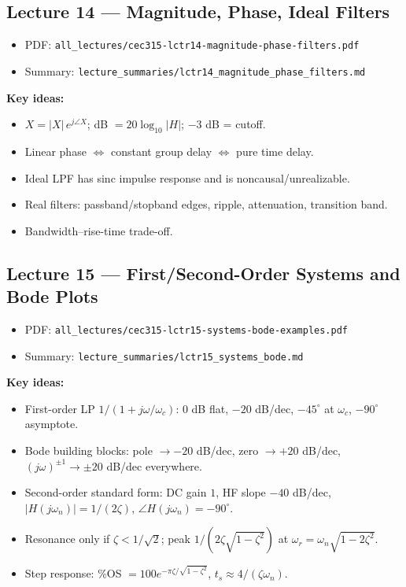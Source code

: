 \documentclass[11pt]{article}
\begin{document}
\subsection{Lecture 14 --- Magnitude, Phase, Ideal Filters}
\begin{itemize}[leftmargin=*]
  \item PDF: \texttt{all\_lectures/cec315-lctr14-magnitude-phase-filters.pdf}
  \item Summary: \texttt{lecture\_summaries/lctr14\_magnitude\_phase\_filters.md}
\end{itemize}
\textbf{Key ideas:}
\begin{itemize}[leftmargin=*]
  \item $X = |X|\, e^{j\angle X}$; dB $=20\log_{10}|H|$; $-3$ dB = cutoff.
  \item Linear phase $\Leftrightarrow$ constant group delay $\Leftrightarrow$ pure time delay.
  \item Ideal LPF has sinc impulse response and is noncausal/unrealizable.
  \item Real filters: passband/stopband edges, ripple, attenuation, transition band.
  \item Bandwidth--rise-time trade-off.
\end{itemize}

\subsection{Lecture 15 --- First/Second-Order Systems and Bode Plots}
\begin{itemize}[leftmargin=*]
  \item PDF: \texttt{all\_lectures/cec315-lctr15-systems-bode-examples.pdf}
  \item Summary: \texttt{lecture\_summaries/lctr15\_systems\_bode.md}
\end{itemize}
\textbf{Key ideas:}
\begin{itemize}[leftmargin=*]
  \item First-order LP $1/(1+j\omega/\omega_c)$: 0 dB flat, $-20$ dB/dec, $-45^\circ$ at $\omega_c$, $-90^\circ$ asymptote.
  \item Bode building blocks: pole $\to -20$ dB/dec, zero $\to +20$ dB/dec, $(j\omega)^{\pm 1}\to \pm 20$ dB/dec everywhere.
  \item Second-order standard form: DC gain $1$, HF slope $-40$ dB/dec, $|H(j\omega_n)|=1/(2\zeta)$, $\angle H(j\omega_n)=-90^\circ$.
  \item Resonance only if $\zeta<1/\sqrt{2}$; peak $1/(2\zeta\sqrt{1-\zeta^2})$ at $\omega_r = \omega_n\sqrt{1-2\zeta^2}$.
  \item Step response: \%OS $= 100 e^{-\pi\zeta/\sqrt{1-\zeta^2}}$, $t_s\approx 4/(\zeta\omega_n)$.
\end{itemize}
\end{document}

